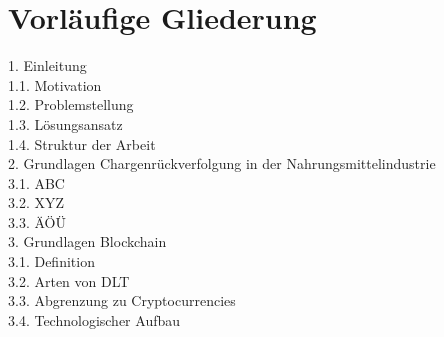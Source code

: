 \section{Vorläufige Gliederung}
\begin{small}
	1. Einleitung\\
	\noindent\hspace*{10mm}%
	1.1. Motivation\\
	\noindent\hspace*{10mm}%
	1.2. Problemstellung\\
	\noindent\hspace*{10mm}%
	1.3. Lösungsansatz\\
	\noindent\hspace*{10mm}%
	1.4. Struktur der Arbeit\\
	2. Grundlagen Chargenrückverfolgung in der Nahrungsmittelindustrie\\
	\noindent\hspace*{10mm}%
	3.1. ABC\\
	\noindent\hspace*{10mm}%
	3.2. XYZ\\
	\noindent\hspace*{10mm}%
	3.3. ÄÖÜ\\
	3. Grundlagen Blockchain\\
	\noindent\hspace*{10mm}%
	3.1. Definition\\
	\noindent\hspace*{10mm}%
	3.2. Arten von DLT\\
	\noindent\hspace*{10mm}%
	3.3. Abgrenzung zu Cryptocurrencies\\
	\noindent\hspace*{10mm}%
	3.4. Technologischer Aufbau\\

\end{small}
